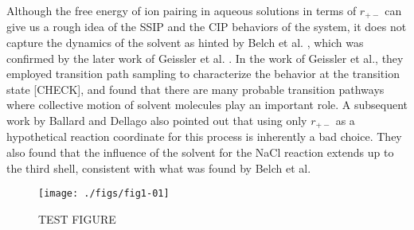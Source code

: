 \begin{spacing}{2.0}
    Although the free energy of ion pairing in aqueous solutions in terms of $r_{+-}$ can give us a rough idea of the SSIP and the CIP behaviors 
    of the system, it does not capture the dynamics of the solvent as hinted by Belch et al. \cite{P-JACS-1986-v108-Belch}, which was confirmed 
    by the later work of Geissler et al. \cite{P-JPhysChemB-1999-v103-Geissler}. In the work of Geissler et al., they employed transition path 
    sampling to characterize the behavior at the transition state [CHECK], and found that there are many probable transition pathways where 
    collective motion of solvent molecules play an important role. A subsequent work by Ballard and Dellago also pointed out that using only 
    $r_{+-}$ as a hypothetical reaction coordinate for this process is inherently a bad choice. \cite{P-JPhysChemB-2012-v116-Ballard} They also 
    found that the influence of the solvent for the NaCl reaction extends up to the third shell, consistent with what was found by Belch et al. 
    \cite{P-JACS-1986-v108-Belch}

    \begin{figure}[H]
        \centering
        \texttt{[image: ./figs/fig1-01]}
        \caption{TEST FIGURE}
    \end{figure}


\end{spacing}

